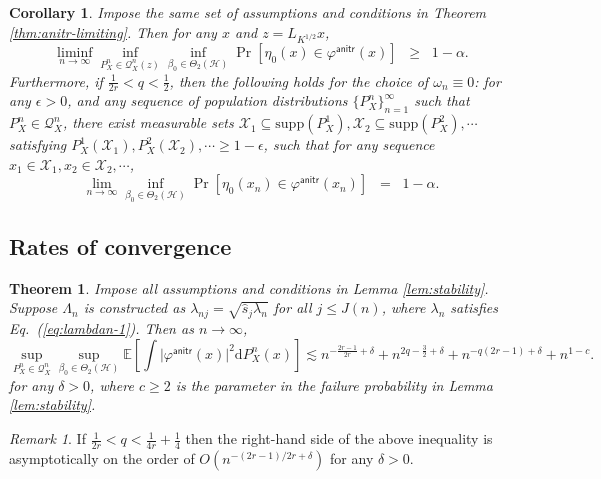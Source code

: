 \documentclass[11pt,a4paper]{article}
\renewcommand{\hat}{\widehat}
\theoremstyle{definition}
\theoremstyle{plain}
\newtheorem{theorem}{Theorem}[section]
\newtheorem{corollary}{Corollary}[section]
\theoremstyle{remark}
\newtheorem{remark}{Remark}[section]
\newcommand{\supp}{\mathrm{supp}}
\newcommand{\mX}{\mathcal X}
\newcommand{\ud}{\mathrm d}
\newcommand{\mH}{\mathcal H}
\newcommand{\anitr}{\mathsf{anitr}}
\begin{document}
\begin{corollary}
Impose the same set of assumptions and conditions in Theorem \ref{thm:anitr-limiting}. Then for any $x$
and $z=L_{K^{1/2}}x$,
$$
\liminf_{n\to\infty}\inf_{P_X^n\in\mathcal Q_X^n(z)}\inf_{\beta_0\in\Theta_2(\mH)}\Pr[\eta_0(x)\in\varphi^\anitr(x)] \;\;\geq\;\; 1-\alpha.
$$
Furthermore, if $\frac{1}{2r}<q<\frac{1}{2}$, then the following holds for the choice of $\omega_n\equiv 0$:
for any $\epsilon>0$, and any sequence of population distributions $\{P_X^n\}_{n=1}^{\infty}$ such that $P_X^n\in\mathcal Q_X^n$, there exist measurable sets $\mX_1\subseteq\supp(P_X^1),\mX_2\subseteq\supp(P_X^2),\cdots$ satisfying $P_X^1(\mX_1),P_X^2(\mX_2),\cdots\geq 1-\epsilon$,
such that for any sequence $x_1\in\mX_1,x_2\in\mX_2,\cdots$, 
$$
\lim_{n\to\infty}\inf_{\beta_0\in\Theta_2(\mH)} \Pr[\eta_0(x_n)\in\varphi^\anitr(x_n)] \;\; = \;\; 1-\alpha.
$$
\label{cor:anitr}
\end{corollary}

\subsection{Rates of convergence}

\begin{theorem}
Impose all assumptions and conditions in Lemma \ref{lem:stability}. Suppose $\Lambda_n$ is constructed as $\lambda_{nj}=\sqrt{\hat s_j\lambda_n}$ for all $j\leq J(n)$,
where $\lambda_n$ satisfies Eq.~(\ref{eq:lambdan-1}). Then as $n\to\infty$, 
$$
\sup_{P_X^n\in\mathcal Q_X^n}\sup_{\beta_0\in\Theta_2(\mH)}\mathbb E\left[\int \big|\varphi^\anitr(x)\big|^2\ud P_X^n(x) \right] \lesssim n^{-\frac{2r-1}{2r}+\delta} + n^{2q-\frac{3}{2}+\delta} + n^{-q(2r-1)+\delta} + n^{1-c}.
$$
for any $\delta>0$, where $c\geq 2$ is the parameter in the failure probability in Lemma \ref{lem:stability}.
\label{thm:anitr-rates}
\end{theorem}

\begin{remark}
If $\frac{1}{2r}<q<\frac{1}{4r}+\frac{1}{4}$ then the right-hand side of the above inequality is asymptotically on the order of $O(n^{-(2r-1)/2r+\delta})$ for any $\delta>0$.
\end{remark}


\end{document}
